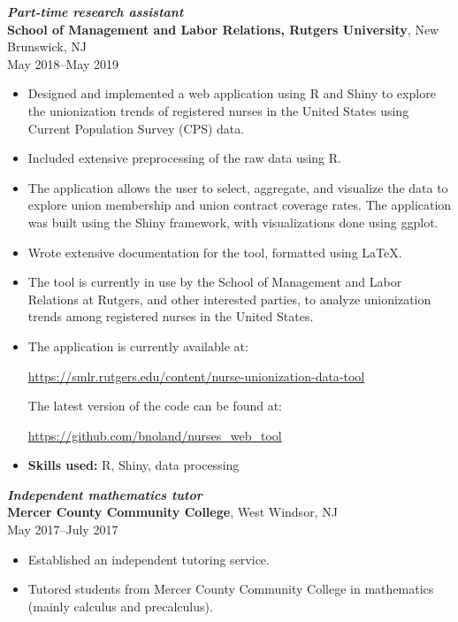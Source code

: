 \documentclass[letterpaper,12pt]{article}
\begin{document}
\textit{\textbf{Part-time research assistant}} \\
\textbf{School of Management and Labor Relations, Rutgers University},
New Brunswick, NJ \\
May 2018--May 2019
\begin{itemize}
\item Designed and implemented a web application using R and Shiny to
  explore the unionization trends of registered nurses in the United
  States using Current Population Survey (CPS) data.
\item Included extensive preprocessing of the raw data using R.
\item The application allows the user to select, aggregate, and
  visualize the data to explore union membership and union contract
  coverage rates. The application was built using the Shiny framework,
  with visualizations done using ggplot.
\item Wrote extensive documentation for the tool, formatted using
  \LaTeX.
\item The tool is currently in use by the School of Management and
  Labor Relations at Rutgers, and other interested parties, to analyze
  unionization trends among registered nurses in the United States.
\item The application is currently available at:
  \begin{center}
    \url{https://smlr.rutgers.edu/content/nurse-unionization-data-tool}
  \end{center}
  The latest version of the code can be found at:
  \begin{center}
    \url{https://github.com/bnoland/nurses_web_tool}
  \end{center}
\item \textbf{Skills used:} R, Shiny, data processing
\end{itemize}

\textit{\textbf{Independent mathematics tutor}} \\
\textbf{Mercer County Community College},
West Windsor, NJ \\
May 2017--July 2017
\begin{itemize}
\item Established an independent tutoring service.
\item Tutored students from Mercer County Community College in
  mathematics (mainly calculus and precalculus).
\end{itemize}
\end{document}

